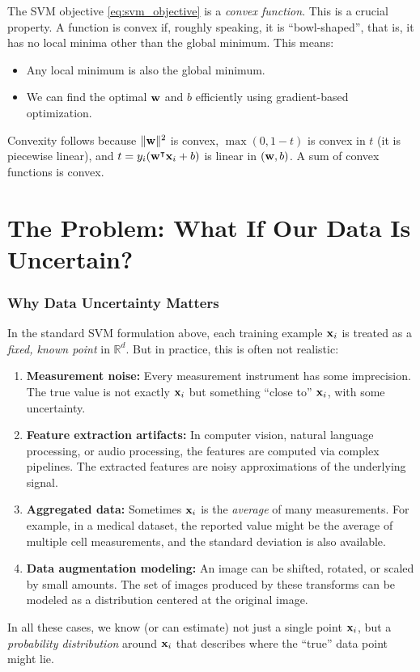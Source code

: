 \documentclass[11pt, letterpaper]{article}
\newcommand{\R}{\mathbb{R}}
\begin{document}
The SVM objective \cref{eq:svm_objective} is a \emph{convex function}. This is a crucial property. A function is convex if, roughly speaking, it is ``bowl-shaped'', that is, it has no local minima other than the global minimum. This means:
\begin{itemize}[leftmargin=2em]
    \item Any local minimum is also the global minimum.
    \item We can find the optimal $\vb{w}$ and $b$ efficiently using gradient-based optimization.
\end{itemize}
Convexity follows because $\|\vb{w}\|^2$ is convex, $\max(0, 1-t)$ is convex in $t$ (it is piecewise linear), and $t = y_i(\vb{w}^{\intercal} \vb{x}_i + b)$ is linear in $(\vb{w}, b)$. A sum of convex functions is convex.


\part{The Problem: What If Our Data Is Uncertain?}

\section{Why Data Uncertainty Matters}

In the standard SVM formulation above, each training example $\vb{x}_i$ is treated as a \emph{fixed, known point} in $\R^d$. But in practice, this is often not realistic:
\begin{enumerate}[leftmargin=2em]
    \item \textbf{Measurement noise:} Every measurement instrument has some imprecision. The true value is not exactly $\vb{x}_i$ but something ``close to'' $\vb{x}_i$, with some uncertainty.
    \item \textbf{Feature extraction artifacts:} In computer vision, natural language processing, or audio processing, the features are computed via complex pipelines. The extracted features are noisy approximations of the underlying signal.
    \item \textbf{Aggregated data:} Sometimes $\vb{x}_i$ is the \emph{average} of many measurements. For example, in a medical dataset, the reported value might be the average of multiple cell measurements, and the standard deviation is also available.
    \item \textbf{Data augmentation modeling:} An image can be shifted, rotated, or scaled by small amounts. The set of images produced by these transforms can be modeled as a distribution centered at the original image.
\end{enumerate}
In all these cases, we know (or can estimate) not just a single point $\vb{x}_i$, but a \emph{probability distribution} around $\vb{x}_i$ that describes where the ``true'' data point might lie.
\end{document}
